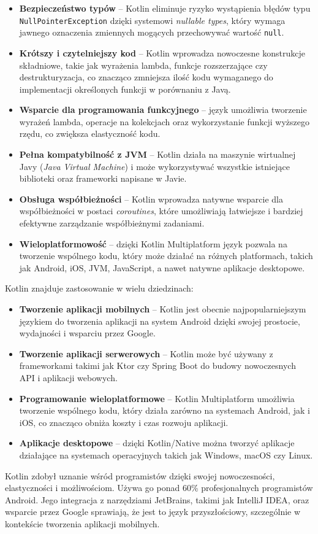 \documentclass[12pt]{article}
\begin{document}
\begin{itemize}
    \item \textbf{Bezpieczeństwo typów} – Kotlin eliminuje ryzyko wystąpienia błędów typu \texttt{NullPointerException} dzięki systemowi \textit{nullable types},
          który wymaga jawnego oznaczenia zmiennych mogących przechowywać wartość \texttt{null}.
    \item \textbf{Krótszy i czytelniejszy kod} – Kotlin wprowadza nowoczesne konstrukcje składniowe, takie jak wyrażenia lambda, funkcje rozszerzające czy destrukturyzacja,
          co znacząco zmniejsza ilość kodu wymaganego do implementacji określonych funkcji w porównaniu z Javą.
    \item \textbf{Wsparcie dla programowania funkcyjnego} – język umożliwia tworzenie wyrażeń lambda, operacje na kolekcjach oraz wykorzystanie funkcji wyższego rzędu,
          co zwiększa elastyczność kodu.
    \item \textbf{Pełna kompatybilność z JVM} – Kotlin działa na maszynie wirtualnej Javy (\textit{Java Virtual Machine}) i może wykorzystywać
          wszystkie istniejące biblioteki oraz frameworki napisane w Javie.
    \item \textbf{Obsługa współbieżności} – Kotlin wprowadza natywne wsparcie dla współbieżności w postaci \textit{coroutines},
          które umożliwiają łatwiejsze i bardziej efektywne zarządzanie współbieżnymi zadaniami.
    \item \textbf{Wieloplatformowość} – dzięki Kotlin Multiplatform język pozwala na tworzenie wspólnego kodu, który może działać na różnych platformach,
          takich jak Android, iOS, JVM, JavaScript, a nawet natywne aplikacje desktopowe.
\end{itemize}
Kotlin znajduje zastosowanie w wielu dziedzinach:
\begin{itemize}
    \item \textbf{Tworzenie aplikacji mobilnych} – Kotlin jest obecnie najpopularniejszym językiem do tworzenia aplikacji na system Android dzięki swojej prostocie,
          wydajności i wsparciu przez Google.
    \item \textbf{Tworzenie aplikacji serwerowych} – Kotlin może być używany z frameworkami takimi jak Ktor czy Spring Boot do budowy nowoczesnych API i aplikacji webowych.
    \item \textbf{Programowanie wieloplatformowe} – Kotlin Multiplatform umożliwia tworzenie wspólnego kodu, który działa zarówno na systemach Android, jak i iOS,
          co znacząco obniża koszty i czas rozwoju aplikacji.
    \item \textbf{Aplikacje desktopowe} – dzięki Kotlin/Native można tworzyć aplikacje działające na systemach operacyjnych takich jak Windows, macOS czy Linux.
\end{itemize}
Kotlin zdobył uznanie wśród programistów dzięki swojej nowoczesności, elastyczności i możliwościom. Używa go ponad 60\% profesjonalnych programistów Android.
\cite{kotlin-popularność} Jego integracja z narzędziami JetBrains, takimi jak IntelliJ IDEA, oraz wsparcie przez Google sprawiają, że jest to język przyszłościowy,
szczególnie w kontekście tworzenia aplikacji mobilnych.
\end{document}
